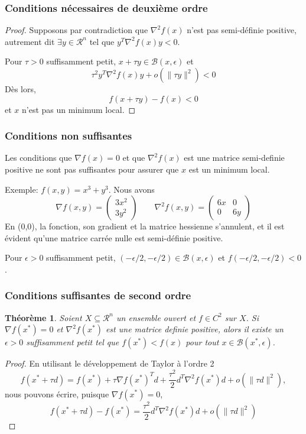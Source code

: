 \documentclass[usepdftitle=false]{beamer}
\newtheorem{thm}{Théorème}
\def\cB{\mathcal{B}}
\def\cR{\mathcal{R}}
\begin{document}
\begin{frame}
\frametitle{Conditions nécessaires de deuxième ordre}

\begin{proof}
Supposons par contradiction que $\nabla^2 f(x)$ n'est pas semi-définie positive, autrement dit $\exists y \in \cR^n$ tel que $y^T \nabla^2 f(x) y < 0$.

Pour $\tau > 0$ suffisamment petit, $x + \tau y \in \cB(x, \epsilon)$ et
$$
\tau^2 y^T \nabla^2 f(x) y + o(\| \tau y \|^2) < 0
$$
Dès lors,
$$
f(x + \tau y) - f(x) < 0
$$
et $x$ n'est pas un minimum local.

\end{proof}

\end{frame}

\begin{frame}
\frametitle{Conditions non suffisantes}

Les conditions que $\nabla f(x) = 0$ et que $\nabla^2 f(x)$ est une matrice semi-definie positive ne sont pas suffisantes pour assurer que $x$ est un minimum local.

\mbox{}

Exemple: $f(x,y) = x^3 + y^3$. Nous avons
$$
\nabla f(x,y) = \begin{pmatrix} 3x^2 \\ 3y^2 \end{pmatrix}
\qquad
\nabla^2 f(x,y) = \begin{pmatrix} 6x & 0 \\ 0 & 6y \end{pmatrix}
$$
En (0,0), la fonction, son gradient et la matrice hessienne s'annulent, et il est évident qu'une matrice carrée nulle est semi-définie positive.

Pour $\epsilon > 0$ suffisamment petit, $(-\epsilon/2, -\epsilon/2) \in \cB(x,\epsilon)$ et $f(-\epsilon/2, -\epsilon/2) < 0$.

\end{frame}

\begin{frame}
\frametitle{Conditions suffisantes de second ordre}

\begin{thm}
Soient $X \subseteq \cR^n$ un ensemble ouvert et $f \in C^2$ sur $X$.
Si $\nabla f(x^*) = 0$ et $\nabla^2 f(x^*)$ est une matrice definie positive, alors il existe un $\epsilon > 0$ suffisamment petit tel que $f(x^*) < f(x)$ pour
tout $x \in \cB (x^*, \epsilon)$.
\end{thm}

\begin{proof}
En utilisant le développement de Taylor à l'ordre 2
$$
f(x^* + \tau d) = f(x^*) + \tau \nabla f(x^*)^T d
+ \frac{\tau^2}{2} d^T \nabla^2 f(x^*)d + o(\| \tau d \|^2),
$$
nous pouvons écrire, puisque $\nabla f(x^*) = 0$,
$$
f(x^* + \tau d) - f(x^*) = \frac{\tau^2}{2} d^T \nabla^2 f(x^*) d + o(\| \tau d \|^2 )
$$

\end{proof}

\end{frame}
\end{document}
